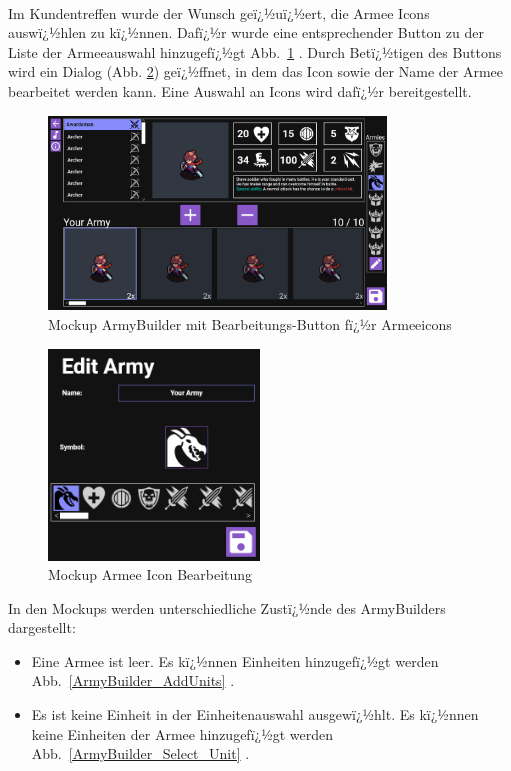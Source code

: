 \documentclass[12pt, titlepage]{scrartcl}
\newcommand{\Abb}[1]{%
	Abb.\ \ref{#1}%
}
\begin{document}
		\ \\Im Kundentreffen wurde der Wunsch geï¿½uï¿½ert, die Armee Icons auswï¿½hlen zu kï¿½nnen. Dafï¿½r wurde eine entsprechender Button zu der Liste der Armeeauswahl hinzugefï¿½gt \Abb{ArmyBuilder_EditButton}. Durch Betï¿½tigen des Buttons wird ein Dialog (Abb. \ref{AmryEditor}) geï¿½ffnet, in dem das Icon sowie der Name der Armee bearbeitet werden kann. Eine Auswahl an Icons wird dafï¿½r bereitgestellt.
		\begin{figure}[H] 
			\centering
			\includegraphics[width=0.8\textwidth]{ArmyBuilder_Save_Edit.png}
			\caption{Mockup ArmyBuilder mit \glqq Bearbeitungs\grqq-Button fï¿½r Armeeicons}
			\label{ArmyBuilder_EditButton}
		\end{figure}
		\begin{figure}[H] 
			\centering
			\includegraphics[width=0.5\textwidth]{ArmyEditor.png}
			\caption{Mockup Armee Icon Bearbeitung}
			\label{AmryEditor}
		\end{figure}
		In den Mockups werden unterschiedliche Zustï¿½nde des ArmyBuilders dargestellt:
		\begin{itemize}
			\item Eine Armee ist leer. Es kï¿½nnen Einheiten hinzugefï¿½gt werden \Abb{ArmyBuilder_AddUnits}.
			\item Es ist keine Einheit in der Einheitenauswahl ausgewï¿½hlt. Es kï¿½nnen keine Einheiten der Armee hinzugefï¿½gt werden \Abb{ArmyBuilder_Select_Unit}. 
		\end{itemize}
\end{document}
